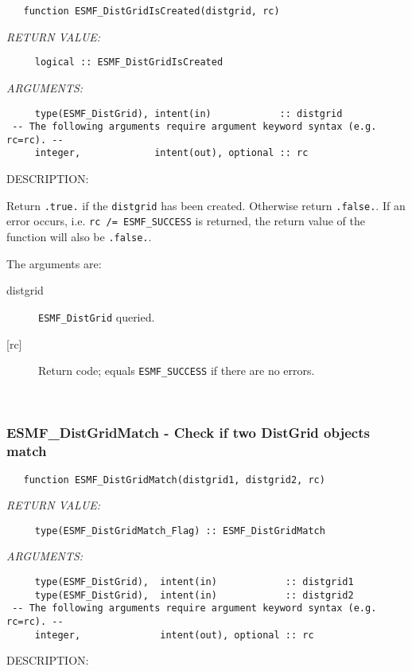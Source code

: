  
\begin{verbatim}   function ESMF_DistGridIsCreated(distgrid, rc)\end{verbatim}{\em RETURN VALUE:}
\begin{verbatim}     logical :: ESMF_DistGridIsCreated\end{verbatim}{\em ARGUMENTS:}
\begin{verbatim}     type(ESMF_DistGrid), intent(in)            :: distgrid
 -- The following arguments require argument keyword syntax (e.g. rc=rc). --
     integer,             intent(out), optional :: rc
 \end{verbatim}
{\sf DESCRIPTION:\\ }


     Return {\tt .true.} if the {\tt distgrid} has been created. Otherwise return
     {\tt .false.}. If an error occurs, i.e. {\tt rc /= ESMF\_SUCCESS} is 
     returned, the return value of the function will also be {\tt .false.}.
  
   The arguments are:
     \begin{description}
     \item[distgrid]
       {\tt ESMF\_DistGrid} queried.
     \item[{[rc]}]
       Return code; equals {\tt ESMF\_SUCCESS} if there are no errors.
     \end{description}
   
 
\mbox{}\hrulefill\ 
 
\subsubsection [ESMF\_DistGridMatch] {ESMF\_DistGridMatch - Check if two DistGrid objects match}


 
\begin{verbatim}   function ESMF_DistGridMatch(distgrid1, distgrid2, rc)\end{verbatim}{\em RETURN VALUE:}
\begin{verbatim}     type(ESMF_DistGridMatch_Flag) :: ESMF_DistGridMatch
       \end{verbatim}{\em ARGUMENTS:}
\begin{verbatim}     type(ESMF_DistGrid),  intent(in)            :: distgrid1
     type(ESMF_DistGrid),  intent(in)            :: distgrid2
 -- The following arguments require argument keyword syntax (e.g. rc=rc). --
     integer,              intent(out), optional :: rc  \end{verbatim}
{\sf DESCRIPTION:\\ }


